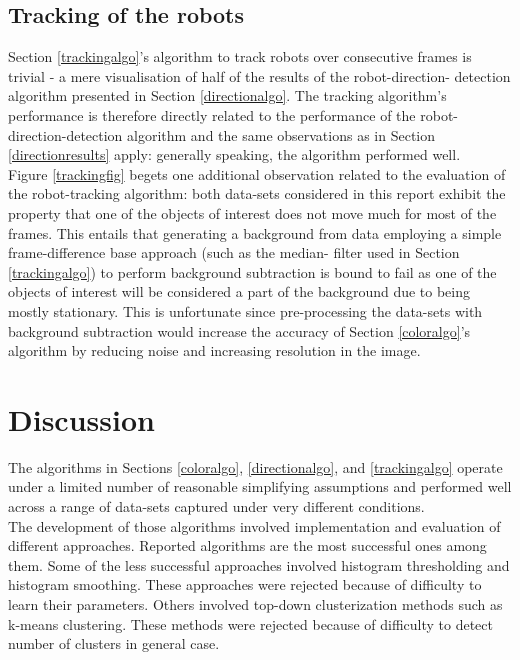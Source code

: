 \documentclass[10pt,a4paper]{article}
\begin{document}
\subsection{Tracking of the robots}\label{trackingresults}
Section \ref{trackingalgo}'s algorithm to track robots over consecutive frames
is trivial - a mere visualisation of half of the results of the robot-direction-
detection algorithm presented in Section \ref{directionalgo}. The tracking 
algorithm's performance is therefore directly related to the performance of 
the robot-direction-detection algorithm and the same observations as in Section
\ref{directionresults} apply: generally speaking, the algorithm performed 
well.\\
Figure \ref{trackingfig} begets one additional observation related to the
evaluation of the robot-tracking algorithm: both data-sets considered in this
report exhibit the property that one of the objects of interest does not move
much for most of the frames. This entails that generating a background from
data employing a simple frame-difference base approach (such as the median-
filter used in Section \ref{trackingalgo}) to perform background subtraction 
is bound to  fail as one of the objects of interest will be considered a part 
of the background due to being mostly stationary. This is unfortunate since
pre-processing the data-sets with background subtraction would increase the
accuracy of Section \ref{coloralgo}'s algorithm by reducing noise and increasing
resolution in the image.

\section{Discussion}\label{discussion}
The algorithms in Sections \ref{coloralgo}, \ref{directionalgo}, and 
\ref{trackingalgo} operate under a limited number of reasonable simplifying
assumptions and performed well across a range of data-sets captured under very
different conditions.\\
The development of those algorithms involved implementation and evaluation of different approaches. 
Reported algorithms are the most successful ones among them. 
Some of the less successful approaches involved histogram thresholding and histogram smoothing.
 These approaches were rejected because of difficulty to learn their parameters. 
Others involved top-down clusterization methods such as k-means clustering. 
These methods were rejected because of difficulty to detect number of clusters in general case.\\
  
\end{document}

